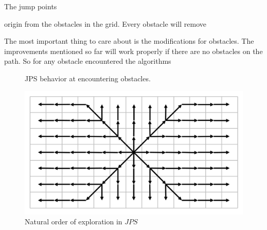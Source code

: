 \documentclass{article}
\begin{document}
    The jump points 
    
    origin from the obstacles in the grid. Every obstacle will remove 
    
    The most important thing to care about is the modifications for obstacles. The improvements mentioned so far will work properly if there are no obstacles on the path. So for any obstacle encountered the algorithms 
    
    \begin{figure}[!htb]
        \centering
        \hfill
        \caption{JPS behavior at encountering obstacles. \cite{JPSexplained}}
    \end{figure}
    
    \begin{figure}[!htb]
        \centering
        \includegraphics[width=\textwidth]{figures/jps_strategy.png}
        \caption{Natural order of exploration in $JPS$}
        \label{fig:pathorder}
    \end{figure}
    
\end{document}
